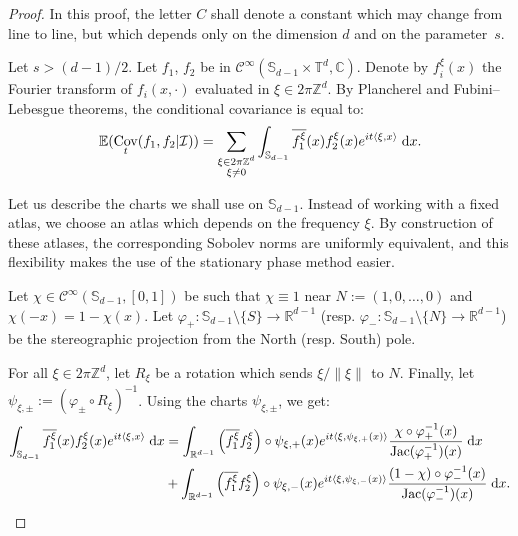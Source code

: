 \documentclass[AHL,Unicode,longabstracts]{cedram}
\DeclareMathOperator{\Cov}{Cov}
\DeclareMathOperator{\Jac}{Jac}
\newcommand{\Z}{\mathbb{Z}}
\newcommand{\R}{\mathbb{R}}
\newcommand{\Cbb}{\mathbb{C}}
\newcommand{\Ebb}{\mathbb{E}}
\newcommand{\Sbb}{\mathbb{S}}
\newcommand{\Tbb}{\mathbb{T}}
\newcommand{\Ccal}{\mathcal{C}}
\newcommand{\Ical}{\mathcal{I}}
\newcommand{\dd}{\;{\rm d}}
\newcommand{\norm}[2]{\left\| #1 \right\|_{#2}}
\begin{document}
\begin{proof}
In this proof, the letter $C$ shall denote a constant which may change from line to line, but which depends only on the dimension $d$ and on the parameter~$s$.


Let $s > (d-1)/2$. Let $f_1$, $f_2$ be in $\Ccal^\infty (\Sbb_{d-1} \times \Tbb^d, \Cbb)$. Denote by $f_i^\xi (x)$ the Fourier transform of $f_i(x, \cdot)$ evaluated in $\xi \in 2\pi\Z^d$. By Plancherel and Fubini--Lebesgue theorems, the conditional covariance is equal to:
\[
\Ebb (\Cov_t (f_1, f_2|\Ical)) = \sum_{\substack{\xi \in 2\pi\Z^d \\ \xi \neq 0}} \int_{\Sbb_{d-1}} \overline{f_1^\xi} (x) f_2^\xi (x) e^{i t \langle \xi, x \rangle} \dd x.
\]

Let us describe the charts we shall use on $\Sbb_{d-1}$. Instead of working with a fixed atlas, we choose an atlas which depends on the frequency $\xi$. By construction of these atlases, the corresponding Sobolev norms are uniformly equivalent, and this flexibility makes the use of the stationary phase method easier.


Let $\chi \in \Ccal^\infty (\Sbb_{d-1}, [0,1])$ be such that $\chi \equiv 1$ near $N:= (1,0, \ldots, 0)$ and\linebreak$\chi (-x) = 1-\chi (x)$. Let $\varphi_+ : \Sbb_{d-1} \setminus \{S\} \to \R^{d-1}$ (resp. $\varphi_- : \Sbb_{d-1} \setminus \{N\} \to \R^{d-1}$) be the stereographic projection from the North (resp. South) pole.


For all $\xi \in 2\pi\Z^d$, let $R_\xi$ be a rotation which sends $\xi/\norm{\xi}{}$ to $N$. Finally, let $\psi_{\xi,\pm} := (\varphi_{\pm} \circ R_\xi)^{-1}$. Using the charts $\psi_{\xi,\pm}$, we get:
\begin{align*}
\int_{\Sbb_{d-1}} \overline{f_1^\xi} (x) f_2^\xi (x) e^{i t \langle \xi, x \rangle} \dd x  &= \int_{\R^{d-1}} \left(\overline{f_1^\xi} f_2^\xi \right) \circ \psi_{\xi,+} (x) e^{i t \langle \xi, \psi_{\xi,+} (x) \rangle} \frac{\chi \circ \varphi_+^{-1} (x)}{\Jac (\varphi_+^{-1}) (x)} \dd x \\
&+ \int_{\R^{d-1}} \left(\overline{f_1^\xi} f_2^\xi \right) \circ \psi_{\xi,-} (x) e^{i t \langle \xi, \psi_{\xi,-} (x) \rangle} \frac{(1-\chi) \circ \varphi_-^{-1} (x)}{\Jac (\varphi_-^{-1}) (x)} \dd x.
\end{align*}


\end{proof}
\end{document}
